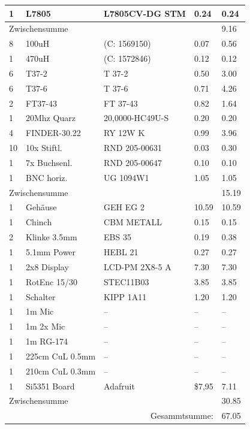 \documentclass[10pt, a4paper]{paper}
\begin{document}
\begin{longtable}{|p{}|p{}|p{}|p{}|p{}|}
 1 & L7805        & L7805CV-DG STM  & 0.24  & 0.24 \\ \hline
 \multicolumn{4}{|l|}{Zwischensumme}        & 9.16 \\ \hline
 8 & 100uH        & (C: 1569150)    & 0.07  & 0.56 \\
 1 & 470uH        & (C: 1572846)    & 0.12  & 0.12 \\
 6 & T37-2        & T 37-2          & 0.50  & 3.00 \\
 6 & T37-6        & T 37-6          & 0.71  & 4.26 \\
 2 & FT37-43      & FT 37-43        & 0.82  & 1.64 \\
 1 & 20Mhz Quarz  & 20,0000-HC49U-S & 0.20  & 0.20 \\ 
 4 & FINDER-30.22 & RY 12W K        & 0.99  & 3.96 \\ 
10 & 10x Stiftl.  & RND 205-00631   & 0.03  & 0.30 \\
 1 & 7x Buchsenl. & RND 205-00647   & 0.10  & 0.10 \\
 1 & BNC horiz.   & UG 1094W1       & 1.05  & 1.05 \\ \hline
 \multicolumn{4}{|l|}{Zwischensumme}        & 15.19 \\ \hline
 1 & Gehäuse      & GEH EG 2        & 10.59 & 10.59 \\
 1 & Chinch       & CBM METALL      & 0.15  & 0.15 \\ 
 2 & Klinke 3.5mm & EBS 35          & 0.19  & 0.38 \\
 1 & 5.1mm Power  & HEBL 21         & 0.27  & 0.27 \\
 1 & 2x8 Display  & LCD-PM 2X8-5 A  & 7.30  & 7.30 \\ 
 1 & RotEnc 15/30 & STEC11B03       & 3.85  & 3.85 \\
 1 & Schalter     & KIPP 1A11       & 1.20  & 1.20 \\
 1 & 1m Mic       & -- & -- & -- \\
 1 & 1m 2x Mic    & -- & -- & -- \\
 1 & 1m RG-174    & -- & -- & -- \\ 
 1 & 225cm CuL 0.5mm & -- & -- & -- \\
 1 & 210cm CuL 0.3mm & -- & -- & -- \\
 1 & Si5351 Board & Adafruit & \$7,95 & 7.11 \\\hline 
 \multicolumn{4}{|l|}{Zwischensumme}        & 30.85 \\ \hline \hline
 \multicolumn{4}{|r|}{Gesammtsumme:}        & 67.05 \\ \hline
\end{longtable}









\end{document}
